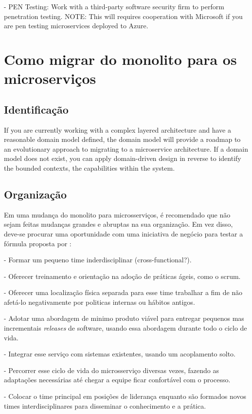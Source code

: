 - PEN Testing: Work with a third-party software security firm to perform penetration testing. NOTE: This will requires cooperation with Microsoft if you are pen testing microservices deployed to Azure.


\section{Como migrar do monolito para os microserviços}

\subsection{Identificação}

If you are currently working with a complex layered architecture and have a reasonable domain model defined, the domain model will provide a roadmap to an evolutionary approach to migrating to a microservice architecture. If a domain model does not exist, you can apply domain-driven design in reverse to identify the bounded contexts, the capabilities within the system. \cite{Familiar2015}

\subsection{Organização}

Em uma mudança do monolito para microsserviços, é recomendado que não sejam feitas mudanças grandes e abruptas na sua organização. Em vez disso, deve-se procurar uma oportunidade com uma iniciativa de negócio para testar a fórmula proposta por  : 

- Formar um pequeno time inderdisciplinar (cross-functional?).

- Oferecer treinamento e orientação na adoção de práticas ágeis, como o scrum.

- Oferecer uma localização física separada para esse time trabalhar a fim de não afetá-lo negativamente por politicas internas ou hábitos antigos.

- Adotar uma abordagem de minimo produto viável para entregar pequenos mas incrementais \emph{releases} de software, usando essa abordagem durante todo o ciclo de vida.

- Integrar esse serviço com sistemas existentes, usando um acoplamento solto.

- Percorrer esse ciclo de vida do microsserviço diversas vezes, fazendo as adaptações necessárias até chegar a equipe ficar confortável com o processo.

- Colocar o time principal em posições de liderança enquanto são formados novos times interdisciplinares para disseminar o conhecimento e a prática.